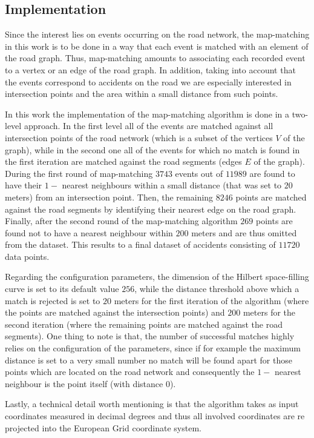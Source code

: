 \documentclass[12pt]{article}
\theoremstyle{definition}
\begin{document}
\subsection{Implementation}
Since the interest lies on events occurring on the road network, the map-matching in this work is to be done in a way that each event is matched with an element of the road graph. Thus, map-matching amounts to associating each recorded event to a vertex or an edge of the road graph. In addition, taking into account that the events correspond to accidents on the road we are especially interested in intersection points and the area within a small distance from such points. 

In this work the implementation of the map-matching algorithm is done in a two-level approach. In the first level all of the events are matched against all intersection points of the road network (which is a subset of the vertices $V$ of the graph), while in the second one all of the events for which no match is found in the first iteration are matched against the road segments (edges $E$ of the graph). During the first round of map-matching $3743$ events out of $11989$ are found to have their $1-$ nearest neighbours within a small distance (that was set to $20$ meters) from an intersection point. Then, the remaining $8246$ points are matched against the road segments by identifying their nearest edge on the road graph. Finally, after the second round of the map-matching algorithm $269$ points are found not to have a nearest neighbour within $200$ meters and are thus omitted from the dataset. This results to a final dataset of accidents consisting of $11720$ data points. 

Regarding the configuration parameters, the dimension of the Hilbert space-filling curve is set to its default value $256$, while the distance threshold above which a match is rejected is set to $20$ meters for the first iteration of the algorithm (where the points are matched against the intersection points) and $200$ meters for the second iteration (where the remaining points are matched against the road segments). One thing to note is that, the number of successful matches highly relies on the configuration of the parameters, since if for example the maximum distance is set to a very small number no match will be found apart for those points which are located on the road network and consequently the $1-$ nearest neighbour is the point itself (with distance $0$). 

Lastly, a technical detail worth mentioning is that the algorithm takes as input coordinates measured in decimal degrees and thus all involved coordinates are re projected into the European Grid coordinate system. 
 
\end{document}
